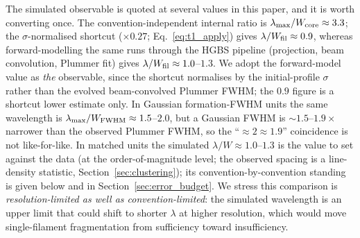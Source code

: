 \documentclass[usenatbib,twoside,twocolumn]{mnras}
\begin{document}
The simulated observable is quoted at several values in this paper, and it is worth converting once. The convention-independent internal ratio is $\lambda_{\rm max}/W_{\rm core}\approx3.3$; the $\sigma$-normalised shortcut ($\times0.27$; Eq.~\ref{eq:t1_apply}) gives $\lambda/W_{\rm fil}\approx0.9$, whereas forward-modelling the same runs through the HGBS pipeline (projection, beam convolution, Plummer fit) gives $\lambda/W_{\rm fil}\approx1.0$--$1.3$. We adopt the forward-model value as \emph{the} observable, since the shortcut normalises by the initial-profile $\sigma$ rather than the evolved beam-convolved Plummer FWHM; the $0.9$ figure is a shortcut lower estimate only. In Gaussian formation-FWHM units the same wavelength is $\lambda_{\rm max}/W_{\rm FWHM}\approx1.5$--$2.0$, but a Gaussian FWHM is $\sim1.5$--$1.9\times$ narrower than the observed Plummer FWHM, so the ``$\approx2\approx1.9$'' coincidence is not like-for-like. In matched units the simulated $\lambda/W\approx1.0$--$1.3$ is the value to set against the data (at the order-of-magnitude level; the observed spacing is a line-density statistic, Section~\ref{sec:clustering}); its convention-by-convention standing is given below and in Section~\ref{sec:error_budget}. We stress this comparison is \emph{resolution-limited as well as convention-limited}: the simulated wavelength is an upper limit that could shift to shorter $\lambda$ at higher resolution, which would move single-filament fragmentation from sufficiency toward insufficiency.
\end{document}
